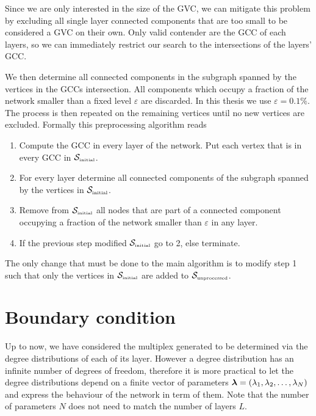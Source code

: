 \documentclass[
11pt, %
english, %
singlespacing, %
nolistspacing, %
liststotoc, %
headsepline, %
]{MastersDoctoralThesis} %
\begin{document}
Since we are only interested in the size of the GVC, we can mitigate this problem by excluding all single layer connected components that are too small to be considered a GVC on their own. Only valid contender are the GCC of each layers, so we can immediately restrict our search to the intersections of the layers' GCC.

We then determine all connected components in the subgraph spanned by the vertices in the GCCs intersection. All components which occupy a fraction of the network smaller than a fixed level $\varepsilon$ are discarded. In this thesis we use $\varepsilon = 0.1\%$. The process is then repeated on the remaining vertices until no new vertices are excluded. Formally this preprocessing algorithm reads

\begin{enumerate}
	\item Compute the GCC in every layer of the network. Put each vertex that is in every GCC in $\mathcal{S}_{\text{\tiny initial}}$.
	\item For every layer determine all connected components of the subgraph spanned by the vertices in $\mathcal{S}_{\text{\tiny initial}}$.
	\item Remove from $\mathcal{S}_{\text{\tiny initial}}$ all nodes that are part of a connected component occupying a fraction of the network smaller than $\varepsilon$ in any layer.
	\item If the previous step modified $\mathcal{S}_{\text{\tiny initial}}$ go to 2, else terminate.
\end{enumerate}

The only change that must be done to the main algorithm is to modify step 1 such that only the vertices in $\mathcal{S}_{\text{\tiny initial}}$ are added to $\mathcal{S}_{\text{\tiny unprocessed}}$.

\section{Boundary condition}
\label{Section: Boundary condition for multilayer}


Up to now, we have considered the multiplex generated to be determined via the degree distributions of each of its layer. However a degree distribution has an infinite number of degrees of freedom, therefore it is more practical to let the degree distributions depend on a finite vector of parameters $\boldsymbol{\mathrm{\lambda}} = (\lambda_1, \lambda_2, \dots, \lambda_N)$ and express the behaviour of the network in term of them. Note that the number of parameters $N$ does not need to match the number of layers $L$.
\end{document}
